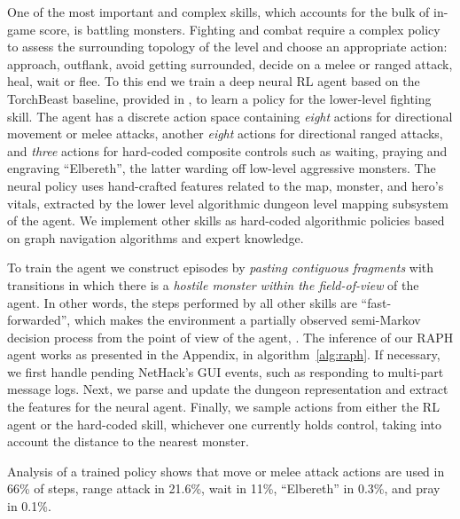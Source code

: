 One of the most important and complex skills, which accounts for the bulk of in-game score, is battling monsters. Fighting and combat require a complex policy to assess the surrounding topology of the level and choose an appropriate action: approach, outflank, avoid getting surrounded, decide on a melee or ranged attack, heal, wait or flee.
%
To this end we train a deep neural RL agent based on the TorchBeast baseline, provided in \cite{kuettler2020nethack}, to learn a policy for the lower-level fighting skill. The agent has a discrete action space containing \emph{eight} actions for directional movement or melee attacks, another \emph{eight} actions for directional ranged attacks, and \emph{three} actions for hard-coded composite controls such as waiting, praying and engraving ``Elbereth'', the latter warding off low-level aggressive monsters.
%
The neural policy uses hand-crafted features related to the map, monster, and hero's vitals, extracted by the lower level algorithmic dungeon level mapping subsystem of the agent.
%
We implement other skills as hard-coded algorithmic policies based on graph navigation algorithms and expert knowledge.

To train the agent we construct episodes by \emph{pasting contiguous fragments} with transitions in which there is a \emph{hostile monster within the field-of-view} of the agent. In other words, the steps performed by all other skills are ``fast-forwarded'', which makes the environment a partially observed semi-Markov decision process from the point of view of the agent, \cite{Sutton1999}.
%
The inference of our RAPH agent works as presented in the Appendix, in algorithm~\ref{alg:raph}. If necessary, we first handle pending NetHack's GUI events, such as responding to multi-part message logs. Next, we parse and update the dungeon representation and extract the features for the neural agent. Finally, we sample actions from either the RL agent or the hard-coded skill, whichever one currently holds control, taking into account the distance to the nearest monster.


Analysis of a trained policy shows that move or melee attack actions are used in 66\% of steps, range attack in 21.6\%, wait in 11\%, ``Elbereth'' in 0.3\%, and pray in 0.1\%. 




